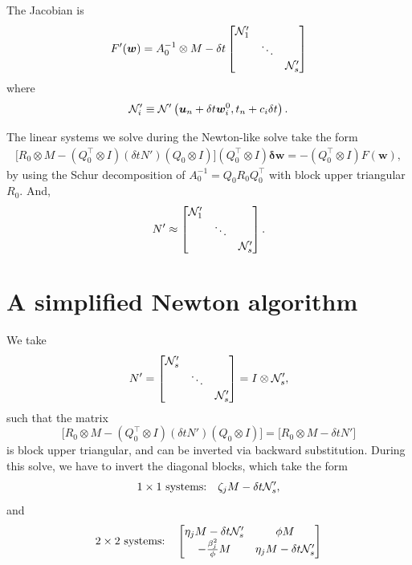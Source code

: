 \documentclass[review]{siamart}
\begin{document}
The Jacobian is
\begin{align}
F'(\bm{w}) = A_0^{-1} \otimes M - 
\delta t
\begin{bmatrix} {\cal N}'_1 \\ 
& \ddots \\ 
& & {\cal N}'_s
\end{bmatrix}
\end{align}
where
\begin{align}
{\cal N}'_i \equiv {\cal N}' \left(\bm{u}_n + \delta t \bm{w}_i^0, t_n + c_i \delta t \right).
\end{align}

The linear systems we solve during the Newton-like solve take the form
\begin{align}
\big[ R_0 \otimes M - (Q_0^\top \otimes  I) (\delta t N')  (Q_0 \otimes I) \big] 
(Q_0^\top \otimes I) \bm{ \delta w } = - (Q_0^\top \otimes I) F( \bm{w}),
\end{align}
by using the Schur decomposition of $A^{-1}_0 = Q_0  R_0 Q^{\top}_0$ with block upper triangular $R_0$. And, 
\begin{align}
N' \approx  
\begin{bmatrix} {\cal N}'_1 \\ 
& \ddots \\ 
& & {\cal N}'_s
\end{bmatrix}.
\end{align}

\section{A simplified Newton algorithm}
We take
\begin{align}
N' = 
\begin{bmatrix} {\cal N}'_s \\ 
& \ddots \\ 
& & {\cal N}'_s
\end{bmatrix}
= 
I \otimes {\cal N}'_s,
\end{align}
such that the matrix 
\[\big[ R_0 \otimes M - (Q_0^\top \otimes  I) (\delta t N')  (Q_0 \otimes I) \big] = 
\big[ R_0 \otimes M - \delta t N' \big] \] is block upper triangular, and can be inverted via backward substitution. During this solve, we have to invert the diagonal blocks, which take the form
\begin{align}
1 \times 1 \textrm{ systems:} \quad \zeta_j M - \delta t {\cal N}'_s,
\end{align}
and 
\begin{align}
2 \times 2 \textrm{ systems:} \quad
\begin{bmatrix}
\eta_j M  - \delta t {\cal N}'_s & \phi M \\
-\tfrac{\beta^2_j}{\phi} M & \eta_j M  - \delta t {\cal N}'_s \\
\end{bmatrix}
\end{align}
\end{document}
